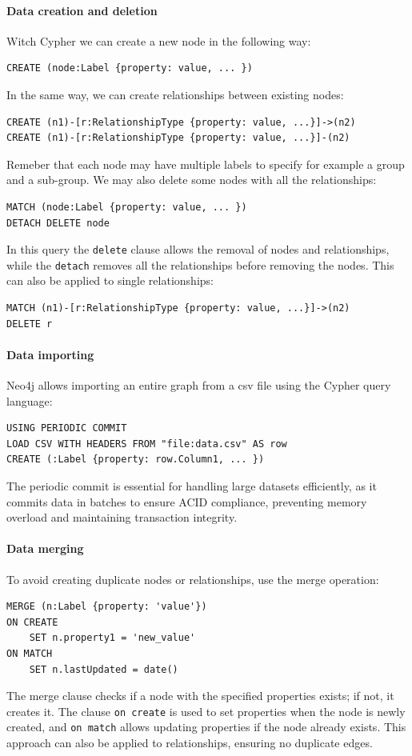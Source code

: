 \paragraph*{Data creation and deletion}
Witch Cypher we can create a new node in the following way: 
\begin{lstlisting}[style=Cypher]
CREATE (node:Label {property: value, ... })
\end{lstlisting}
In the same way, we can create relationships between existing nodes: 
\begin{lstlisting}[style=Cypher]
CREATE (n1)-[r:RelationshipType {property: value, ...}]->(n2)
CREATE (n1)-[r:RelationshipType {property: value, ...}]-(n2)
\end{lstlisting}
Remeber that each node may have multiple labels to specify for example a group and a sub-group. 
We may also delete some nodes with all the relationships: 
\begin{lstlisting}[style=Cypher]
MATCH (node:Label {property: value, ... }) 
DETACH DELETE node
\end{lstlisting}
In this query the \texttt{delete} clause allows the removal of nodes and relationships, while the \texttt{detach} removes all the relationships before removing the nodes.
This can also be applied to single relationships: 
\begin{lstlisting}[style=Cypher]
MATCH (n1)-[r:RelationshipType {property: value, ...}]->(n2)
DELETE r
\end{lstlisting}

\paragraph*{Data importing}
Neo4j allows importing an entire graph from a csv file using the Cypher query language:
\begin{lstlisting}[style=Cypher]
USING PERIODIC COMMIT 
LOAD CSV WITH HEADERS FROM "file:data.csv" AS row
CREATE (:Label {property: row.Column1, ... })
\end{lstlisting}
The periodic commit is essential for handling large datasets efficiently, as it commits data in batches to ensure ACID compliance, preventing memory overload and maintaining transaction integrity.

\paragraph*{Data merging}
To avoid creating duplicate nodes or relationships, use the merge operation:
\begin{lstlisting}[style=Cypher]
MERGE (n:Label {property: 'value'})
ON CREATE 
    SET n.property1 = 'new_value'
ON MATCH 
    SET n.lastUpdated = date()
\end{lstlisting}
The merge clause checks if a node with the specified properties exists; if not, it creates it. 
The clause \texttt{on create} is used to set properties when the node is newly created, and \texttt{on match} allows updating properties if the node already exists. 
This approach can also be applied to relationships, ensuring no duplicate edges.

